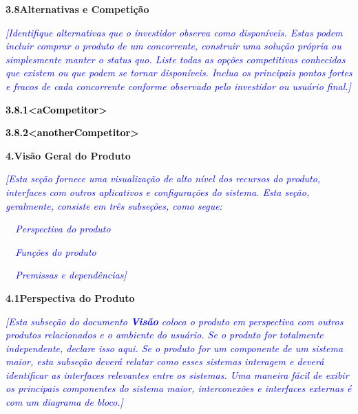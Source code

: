 \documentclass[a4paper]{article}
\begin{document}
\bigskip


\bigskip

\hypertarget{ojfvyd3ys12u}{}\textbf{3.8Alternativas e Competi\c{c}\~ao}

\textit{\textcolor{blue}{[Identifique alternativas que o investidor observa como dispon\'iveis. Estas podem incluir
comprar o produto de um concorrente, construir uma solu\c{c}\~ao pr\'opria ou simplesmente manter o status quo. Liste
todas as op\c{c}\~oes competitivas conhecidas que existem ou que podem se tornar dispon\'iveis. Inclua os principais
pontos fortes e fracos de cada concorrente conforme observado pelo investidor ou usu\'ario final.]}}

{\color[rgb]{0.2627451,0.2627451,0.2627451}
\hypertarget{528oqfd97zah}{}\textbf{\textcolor{black}{3.8.1{\textless}aCompetitor{\textgreater}}}}

{\color[rgb]{0.2627451,0.2627451,0.2627451}
\hypertarget{t54ljqskjpsf}{}\textbf{\textcolor{black}{3.8.2{\textless}anotherCompetitor{\textgreater}}}}

\hypertarget{lggugq9mkeu5}{}\textbf{4.Vis\~ao Geral do Produto}

\textit{\textcolor{blue}{[Esta se\c{c}\~ao fornece uma visualiza\c{c}\~ao de alto n\'ivel dos recursos do produto,
interfaces com outros aplicativos e configura\c{c}\~oes do sistema. Esta se\c{c}\~ao, geralmente, consiste em tr\^es
subse\c{c}\~oes, como segue:}}

\textcolor{blue}{{\textbullet}}\textit{\textcolor{blue}{\ \ Perspectiva do produto}}

\textcolor{blue}{{\textbullet}}\textit{\textcolor{blue}{\ \ Fun\c{c}\~oes do produto}}

\textcolor{blue}{{\textbullet}}\textit{\textcolor{blue}{\ \ Premissas e depend\^encias]}}

\hypertarget{x6rte7p40tn8}{}\textbf{4.1Perspectiva do Produto}

\textit{\textcolor{blue}{[Esta subse\c{c}\~ao do documento
}}\textbf{\textit{\textcolor{blue}{Vis\~ao}}}\textit{\textcolor{blue}{ coloca o produto em perspectiva com outros
produtos relacionados e o ambiente do usu\'ario. Se o produto for totalmente independente, declare isso aqui. Se o
produto for um componente de um sistema maior, esta subse\c{c}\~ao dever\'a relatar como esses sistemas interagem e
dever\'a identificar as interfaces relevantes entre os sistemas. Uma maneira f\'acil de exibir os principais
componentes do sistema maior, interconex\~oes e interfaces externas \'e com um diagrama de bloco.]}}
\end{document}
